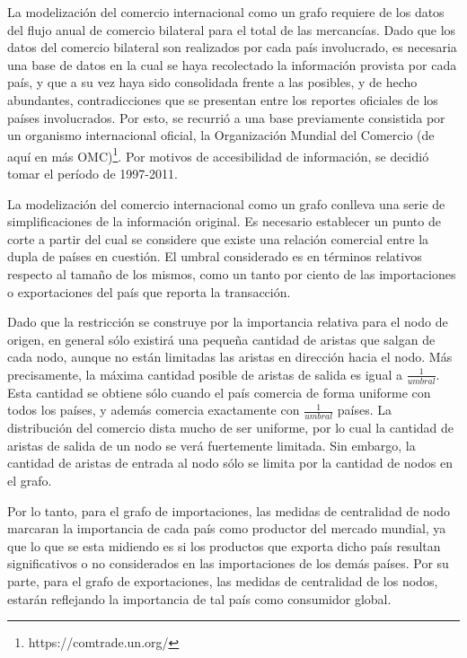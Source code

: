 \documentclass[a4paper]{llncs}
\begin{document}
	La modelización del comercio internacional como un grafo requiere de los datos del flujo anual de comercio bilateral para el total de las mercancías. Dado que los datos del comercio bilateral son realizados por cada país involucrado, es necesaria una base de datos en la cual se haya recolectado la información provista por cada país, y que a su vez haya sido consolidada frente a las posibles, y de hecho abundantes, contradicciones que se presentan entre los reportes oficiales de los países involucrados. Por esto, se recurrió a una base previamente consistida por un organismo internacional oficial, la Organización Mundial del Comercio (de aquí en más OMC)\footnote{https://comtrade.un.org/}. Por motivos de accesibilidad de información, se decidió tomar el período de 1997-2011.
	

	
	La modelización del comercio internacional como un grafo conlleva una serie de simplificaciones de la información original. Es necesario establecer un punto de corte a partir del cual se considere que existe una relación comercial entre la dupla de países en cuestión. El umbral considerado es en términos relativos respecto al tamaño de los mismos, como un tanto por ciento de las importaciones o exportaciones del país que reporta la transacción.
			
	Dado que la restricción se construye por la importancia relativa para el nodo de origen, en general sólo existirá una pequeña cantidad de aristas que salgan de cada nodo, aunque no están limitadas las aristas en dirección hacia el nodo. Más precisamente, la máxima cantidad posible de aristas de salida es igual a $\frac{1}{umbral}$. Esta cantidad se obtiene sólo cuando el país comercia de forma uniforme con todos los países, y además comercia exactamente con $\frac{1}{umbral}$ países. La distribución del comercio dista mucho de ser uniforme, por lo cual la cantidad de aristas de salida de un nodo se verá fuertemente limitada. Sin embargo, la cantidad de aristas de entrada al nodo sólo se limita por la cantidad de nodos en el grafo. 
	
	Por lo tanto, para el grafo de importaciones, las medidas de centralidad de nodo marcaran la importancia de cada país como productor del mercado mundial, ya que lo que se esta midiendo es si los productos que exporta dicho país resultan significativos o no considerados en las importaciones de los demás países. Por su parte, para el grafo de exportaciones, las medidas de centralidad de los nodos, estarán reflejando la importancia de tal país como consumidor global. 
	
\end{document}
